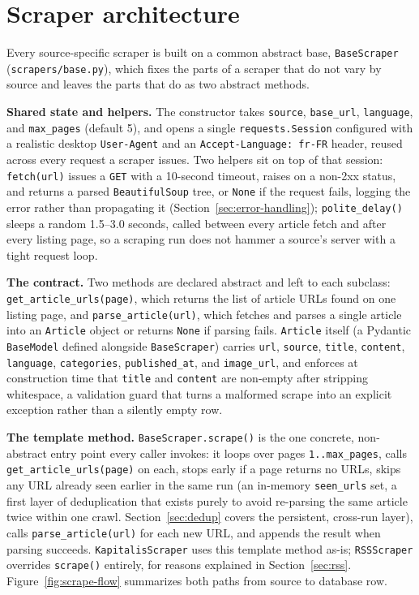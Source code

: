 \section{Scraper architecture}
\label{sec:scraper-arch}
Every source-specific scraper is built on a common abstract base, \texttt{BaseScraper} (\texttt{scrapers/base.py}), which fixes the parts of a scraper that do not vary by source and leaves the parts that do as two abstract methods.

\textbf{Shared state and helpers.} The constructor takes \texttt{source}, \texttt{base\_\allowbreak url}, \texttt{language}, and \texttt{max\_\allowbreak pages} (default 5), and opens a single \texttt{requests.Session} configured with a realistic desktop \texttt{User-Agent} and an \texttt{Accept-Language: fr-FR} header, reused across every request a scraper issues. Two helpers sit on top of that session: \texttt{fetch(url)} issues a \texttt{GET} with a 10-second timeout, raises on a non-2xx status, and returns a parsed \texttt{BeautifulSoup} tree, or \texttt{None} if the request fails, logging the error rather than propagating it (Section~\ref{sec:error-handling}); \texttt{polite\_delay()} sleeps a random 1.5--3.0 seconds, called between every article fetch and after every listing page, so a scraping run does not hammer a source's server with a tight request loop.

\textbf{The contract.} Two methods are declared abstract and left to each subclass: \texttt{get\_\allowbreak article\_\allowbreak urls(page)}, which returns the list of article URLs found on one listing page, and \texttt{parse\_article(url)}, which fetches and parses a single article into an \texttt{Article} object or returns \texttt{None} if parsing fails. \texttt{Article} itself (a Pydantic \texttt{BaseModel} defined alongside \texttt{BaseScraper}) carries \texttt{url}, \texttt{source}, \texttt{title}, \texttt{content}, \texttt{language}, \texttt{categories}, \texttt{published\_at}, and \texttt{image\_url}, and enforces at construction time that \texttt{title} and \texttt{content} are non-empty after stripping whitespace, a validation guard that turns a malformed scrape into an explicit exception rather than a silently empty row.

\textbf{The template method.} \texttt{BaseScraper.\allowbreak scrape()} is the one concrete, non-abstract entry point every caller invokes: it loops over pages \texttt{1..max\_pages}, calls \texttt{get\_article\_urls(page)} on each, stops early if a page returns no URLs, skips any URL already seen earlier in the same run (an in-memory \texttt{seen\_urls} set, a first layer of deduplication that exists purely to avoid re-parsing the same article twice within one crawl. Section~\ref{sec:dedup} covers the persistent, cross-run layer), calls \texttt{parse\_article(url)} for each new URL, and appends the result when parsing succeeds. \texttt{Kapitalis\allowbreak Scraper} uses this template method as-is; \texttt{RSSScraper} overrides \texttt{scrape()} entirely, for reasons explained in Section~\ref{sec:rss}. Figure~\ref{fig:scrape-flow} summarizes both paths from source to database row.

